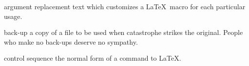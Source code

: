 \documentclass[../main.tex]{subfiles}
\begin{document}
\begin{glossary}
\item[argument] replacement text which customizes a \LaTeX\ macro for
each particular usage.
\item[back-up] a copy of a file to be used when catastrophe strikes
the original.  People who make no back-ups deserve
no sympathy.
\item[control sequence] the normal form of a command to \LaTeX.
 
\end{glossary}
\end{document}
